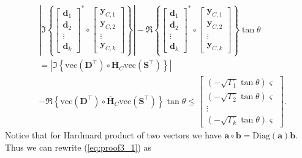 \begin{equation}
\label{eq:proof3_1}
\begin{aligned}
    &\left| \Im\left\{
    \begin{bmatrix}
        \mathbf{d}_1 \\
        \mathbf{d}_2 \\
        \vdots \\
        \mathbf{d}_k
    \end{bmatrix}^*
    \circ
    \begin{bmatrix}
        \mathbf{y}_{C,1} \\
        \mathbf{y}_{C,2} \\
        \vdots \\
        \mathbf{y}_{C,k}
    \end{bmatrix}\right\} \right| - 
    \Re\left\{
    \begin{bmatrix}
        \mathbf{d}_1 \\
        \mathbf{d}_2 \\
        \vdots \\
        \mathbf{d}_k
    \end{bmatrix}^*
    \circ
    \begin{bmatrix}
        \mathbf{y}_{C,1} \\
        \mathbf{y}_{C,2} \\
        \vdots \\
        \mathbf{y}_{C,k}
    \end{bmatrix}\right\}\tan\theta \\
    &=\left|\Im\left\{\text{vec}(\mathbf{D}^{\top})\circ\overline{\mathbf{H}}_C\text{vec}(\mathbf{S}^{\top}) \right\}\right| \\&- \Re\left\{\text{vec}(\mathbf{D}^{\top})\circ\overline{\mathbf{H}}_C\text{vec}(\mathbf{S}^{\top}) \right\}\tan\theta \leq
    \begin{bmatrix}
        (-\sqrt{\Gamma_1}\tan\theta)\bm{\varsigma} \\
        (-\sqrt{\Gamma_2}\tan\theta)\bm{\varsigma} \\
        \vdots \\
        (-\sqrt{\Gamma_k}\tan\theta)\bm{\varsigma}
    \end{bmatrix}.
\end{aligned}
\end{equation}
Notice that for Hardmard product of two vectors we have $\mathbf{a}\circ\mathbf{b}=\text{Diag}(\mathbf{a})\mathbf{b}$. Thus we can rewrite (\ref{eq:proof3_1}) as
